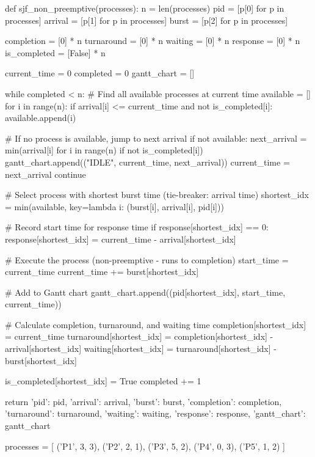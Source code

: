 def sjf_non_preemptive(processes):
    n = len(processes)
    pid = [p[0] for p in processes]
    arrival = [p[1] for p in processes]
    burst = [p[2] for p in processes]
    
    completion = [0] * n
    turnaround = [0] * n
    waiting = [0] * n
    response = [0] * n
    is_completed = [False] * n
    
    current_time = 0
    completed = 0
    gantt_chart = []
    
    while completed < n:
        # Find all available processes at current time
        available = []
        for i in range(n):
            if arrival[i] <= current_time and not is_completed[i]:
                available.append(i)
        
        # If no process is available, jump to next arrival
        if not available:
            next_arrival = min(arrival[i] for i in range(n) if not is_completed[i])
            gantt_chart.append(("IDLE", current_time, next_arrival))
            current_time = next_arrival
            continue
        
        # Select process with shortest burst time (tie-breaker: arrival time)
        shortest_idx = min(available, key=lambda i: (burst[i], arrival[i], pid[i]))
        
        # Record start time for response time
        if response[shortest_idx] == 0:
            response[shortest_idx] = current_time - arrival[shortest_idx]
        
        # Execute the process (non-preemptive - runs to completion)
        start_time = current_time
        current_time += burst[shortest_idx]
        
        # Add to Gantt chart
        gantt_chart.append((pid[shortest_idx], start_time, current_time))
        
        # Calculate completion, turnaround, and waiting time
        completion[shortest_idx] = current_time
        turnaround[shortest_idx] = completion[shortest_idx] - arrival[shortest_idx]
        waiting[shortest_idx] = turnaround[shortest_idx] - burst[shortest_idx]
        
        is_completed[shortest_idx] = True
        completed += 1
    
    return {
        'pid': pid, 'arrival': arrival, 'burst': burst,
        'completion': completion, 'turnaround': turnaround,
        'waiting': waiting, 'response': response,
        'gantt_chart': gantt_chart
    }


processes = [
    ('P1', 3, 3), ('P2', 2, 1), ('P3', 5, 2),
    ('P4', 0, 3), ('P5', 1, 2)
]

